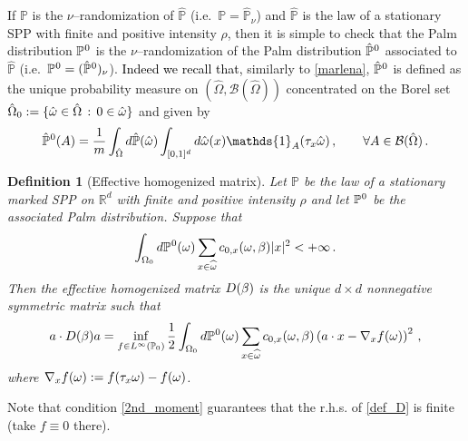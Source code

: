 \documentclass[12pt,a4paper,reqno]{amsart}
\newtheorem{Definition}[Theorem]{Definition}
\newcommand{\cB}{\ensuremath{\mathcal B}}
\newcommand{\bbP}{{\ensuremath{\mathbb P}} }
\newcommand{\bbR}{{\ensuremath{\mathbb R}} }
\let\O=\Omega \let\P=\Pi   \let\Ps=\Psi \let\Si=\Sigma \let\X=\Xi
\newcommand{\rosso}{\textcolor{black}} %
\newcommand{\vvv}{\textcolor{black}} %
\newcommand{\be}{\begin{equation}}
\newcommand{\en}{\end{equation}}
\newcommand{\vpz}{\vvv{\bbP^{\hspace{0.013cm}0} }}
\newcommand{\hvpz}{\vvv{{\hat \bbP}^{\hspace{0.013cm}0} }}
\begin{document}
If $\bbP$ is the $\nu$--randomization of $\hat \bbP$ (i.e.~$\bbP=\hat\bbP_\nu$) and $\hat \bbP$ is the law of a stationary SPP with finite and positive  intensity $\rho$, then it is simple to check 
 that the Palm distribution $\vpz$ is the $\nu$--randomization of the Palm distribution $\hvpz$ associated to $\hat\bbP$ (i.e.~$\vpz=(\hvpz)_\nu$). \rosso{Indeed we recall that,}  similarly to \eqref{marlena}, $\hvpz$ is defined as the 
unique probability measure on  $(\hat\O,\cB(\hat \O))$  concentrated on the Borel set $\hat \O_0:=\{\hat \o\in \hat \O\,:\, 0 \in \hat \o\}$ and given by 
\begin{equation}\label{marlenabis}
\hvpz(A)= \frac{1}{m} \int _{\hat\O}d \hat \bbP(\hat \o)\int_{[0,1]^d}  d\hat{\o} (x) \mathds{1}_A(\t_x \hat \o)\,, \qquad \forall A \in \cB( \hat \O) \,.
 \end{equation}





\begin{Definition}[Effective homogenized  matrix] Let $\bbP$ be the law of a stationary  marked SPP on $\bbR^d$ with finite and positive  intensity $\rho$ and let $\vpz$ be the associated Palm distribution. Suppose that 
\be\label{2nd_moment}
\int_{\O_0} d\vpz(\o)\sum_{x\in \widehat \o}  c_{0,x}(\o,\b)|x|^2 <+\infty\,.
\en
Then
the \emph{effective homogenized  matrix}  $D(\beta)$ is  
the unique $d\times d$ nonnegative symmetric matrix such that
 \begin{equation}\label{def_D}
 a \cdot D(\b) a =\inf _{ f\in L^\infty(\bbP_0) } \frac{1}{2}\int_{\O_0} d\vpz(\o)\sum_{x\in \widehat \o}  c_{0,x}(\o,\b) \left
 (a\cdot x - \nabla_x f (\o) 
\right)^2\,,
 \end{equation}
 where $\nabla_x f (\omega) := f(\tau_x \omega) - f(\omega)$.
\end{Definition}

Note that condition \eqref{2nd_moment} guarantees that the r.h.s. of \eqref{def_D} is finite (take $f\equiv 0$ there).
\end{document}
